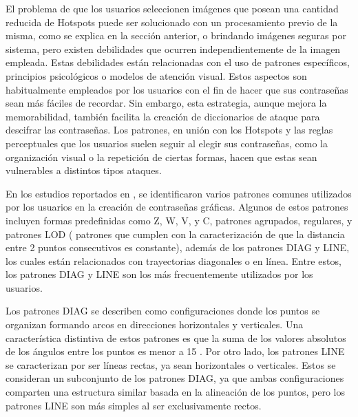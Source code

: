 \documentclass[12pt]{report}
\begin{document}
El problema de que los usuarios seleccionen imágenes que posean una cantidad reducida de Hotspots puede ser solucionado con un procesamiento previo de la misma, como se explica en la sección anterior, o brindando imágenes seguras por sistema, pero existen debilidades que ocurren independientemente de la imagen empleada. Estas debilidades están relacionadas con el uso de patrones específicos, principios psicológicos o modelos de atención visual. Estos aspectos son habitualmente empleados por los usuarios con el fin de hacer que sus contraseñas sean más fáciles de recordar. Sin embargo, esta estrategia, aunque mejora la memorabilidad, también facilita la creación de diccionarios de ataque para descifrar las contraseñas. Los patrones, en unión con los Hotspots y las reglas perceptuales que los usuarios suelen seguir al elegir sus contraseñas, como la organización visual o la repetición de ciertas formas, hacen que estas sean vulnerables a distintos tipos  ataques.



En los estudios reportados en \cite{5,20,21,22,23,24,25}, se identificaron varios patrones comunes utilizados por los usuarios en la creación de contraseñas gráficas. Algunos de estos patrones incluyen formas predefinidas como Z, W, V, y C, patrones agrupados, regulares, y patrones LOD ( patrones que cumplen con la caracterización de que la distancia entre 2 puntos consecutivos es constante), además de los patrones DIAG y LINE, los cuales están relacionados con trayectorias diagonales o en línea. Entre estos, los patrones DIAG y LINE son los más frecuentemente utilizados por los usuarios.

Los patrones DIAG se describen como configuraciones donde los puntos se organizan formando arcos en direcciones horizontales y verticales. Una característica distintiva de estos patrones es que la suma de los valores absolutos de los ángulos entre los puntos es menor a 15 \degree. Por otro lado, los patrones LINE se caracterizan por ser líneas rectas, ya sean horizontales o verticales. Estos se consideran un subconjunto de los patrones DIAG, ya que ambas configuraciones comparten una estructura similar basada en la alineación de los puntos, pero los patrones LINE son más simples al ser exclusivamente rectos.
\end{document}
